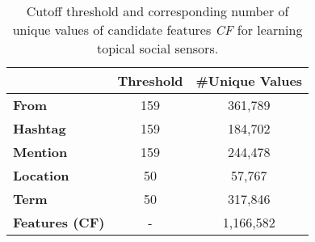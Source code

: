 



\begin{table}[t!]
\centering
{%
\small
\renewcommand{\arraystretch}{1.2}
\begin{tabular}{|l|c|c|}
\hline
 & \textbf{Threshold} & \textbf{\#Unique Values} \\ \hline
\textbf{From} & 159 & 361,789 \\ \hline
\textbf{Hashtag} & 159 & 184,702 \\ \hline
\textbf{Mention} & 159 & 244,478 \\ \hline
\textbf{Location} & 50 & 57,767 \\ \hline
\textbf{Term} & 50 & 317,846 \\ \hline
\textbf{Features (CF)} & - & 1,166,582 \\ \hline
\end{tabular}
}
\caption{Cutoff threshold and corresponding number of unique values of candidate features \textit{CF} for learning topical social sensors.}
\label{table:learningFeatures}
\end{table}


